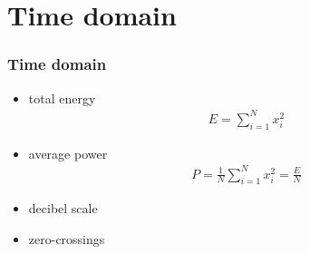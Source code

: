 
\section{Time domain}

\begin{frame}
	\frametitle{Time domain}
	\begin{itemize}
		\item total energy
			\begin{align*}
				E=\sum_{i=1}^Nx_i^2
			\end{align*}
		\item average power
			\begin{align*}
				P=\frac1N\sum_{i=1}^Nx_i^2=\frac EN
			\end{align*}
		\item decibel scale
		\item zero-crossings
	\end{itemize}
\end{frame}

